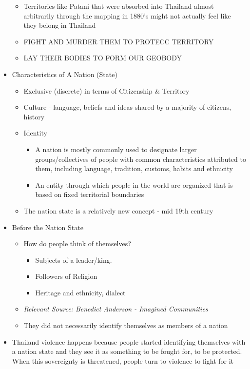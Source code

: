 \documentclass[a4paper]{article}
\begin{document}
\begin{itemize}
\begin{itemize}[label=$\circ$]
		\item Territories like Patani that were absorbed into Thailand almost arbitrarily through the mapping in 1880’s might not actually feel like they belong in Thailand
		\item FIGHT AND MURDER THEM TO PROTECC TERRITORY
		\item LAY THEIR BODIES TO FORM OUR GEOBODY
	\end{itemize}
	\item Characteristics of A Nation (State)
	\begin{itemize}[label=$\circ$]
		\item Exclusive (discrete) in terms of Citizenship \& Territory 
		\item Culture - language, beliefs and ideas shared by a majority of citizens, history
		\item Identity 
		\begin{itemize}[label=\tiny$\blacksquare$]
			\item A nation is mostly commonly used to designate larger groups/collectives of people with common characteristics attributed to them, including language, tradition, customs, habits and ethnicity
			\item An entity through which people in the world are organized that is based on fixed territorial boundaries
		\end{itemize}
		\item The nation state is a relatively new concept - mid 19th century
	\end{itemize}
	\item Before the Nation State
	\begin{itemize}[label=$\circ$]
		\item How do people think of themselves? 
		\begin{itemize}[label=\tiny$\blacksquare$]
			\item Subjects of a leader/king.
			\item Followers of Religion
			\item Heritage and ethnicity, dialect
		\end{itemize}
		\item \textit{Relevant Source: Benedict Anderson - Imagined Communities}
		\item They did not necessarily identify themselves as members of a nation
	\end{itemize}
	\item Thailand violence happens because people started identifying themselves with a nation state and they see it as something to be fought for, to be protected. When this sovereignty is threatened, people turn to violence to fight for it
\end{itemize}
\end{document}
